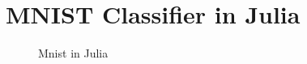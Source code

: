 \chapter{MNIST Classifier in Julia}
\label{app:juliamnist}

\begin{figure}[h]
    \centering
    
    \caption{Mnist in Julia}
    \label{fig:juliamnist}
\end{figure}